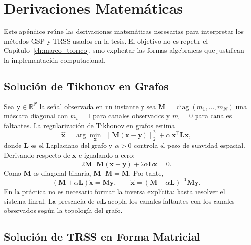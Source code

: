 \chapter{Derivaciones Matemáticas}
\label{ap:derivaciones}

Este apéndice reúne las derivaciones matemáticas necesarias para interpretar los métodos GSP y TRSS usados en la tesis. El objetivo no es repetir el Capítulo~\ref{ch:marco_teorico}, sino explicitar las formas algebraicas que justifican la implementación computacional.

\section{Solución de Tikhonov en Grafos}

Sea $\mathbf{y}\in\mathbb{R}^{N}$ la señal observada en un instante y sea $\mathbf{M}=\operatorname{diag}(m_1,\dots,m_N)$ una máscara diagonal con $m_i=1$ para canales observados y $m_i=0$ para canales faltantes. La regularización de Tikhonov en grafos estima
\begin{equation}
\hat{\mathbf{x}}=\arg\min_{\mathbf{x}}\; \|\mathbf{M}(\mathbf{x}-\mathbf{y})\|_2^2 + \alpha\,\mathbf{x}^{\top}\mathbf{L}\mathbf{x},
\end{equation}
donde $\mathbf{L}$ es el Laplaciano del grafo y $\alpha>0$ controla el peso de suavidad espacial. Derivando respecto de $\mathbf{x}$ e igualando a cero:
\begin{equation}
2\mathbf{M}^{\top}\mathbf{M}(\mathbf{x}-\mathbf{y}) + 2\alpha\mathbf{L}\mathbf{x}=0.
\end{equation}
Como $\mathbf{M}$ es diagonal binaria, $\mathbf{M}^{\top}\mathbf{M}=\mathbf{M}$. Por tanto,
\begin{equation}
(\mathbf{M}+\alpha\mathbf{L})\hat{\mathbf{x}}=\mathbf{M}\mathbf{y},
\qquad
\hat{\mathbf{x}}=(\mathbf{M}+\alpha\mathbf{L})^{-1}\mathbf{M}\mathbf{y}.
\end{equation}
En la práctica no es necesario formar la inversa explícita: basta resolver el sistema lineal. La presencia de $\alpha\mathbf{L}$ acopla los canales faltantes con los canales observados según la topología del grafo.

\section{Solución de TRSS en Forma Matricial}

